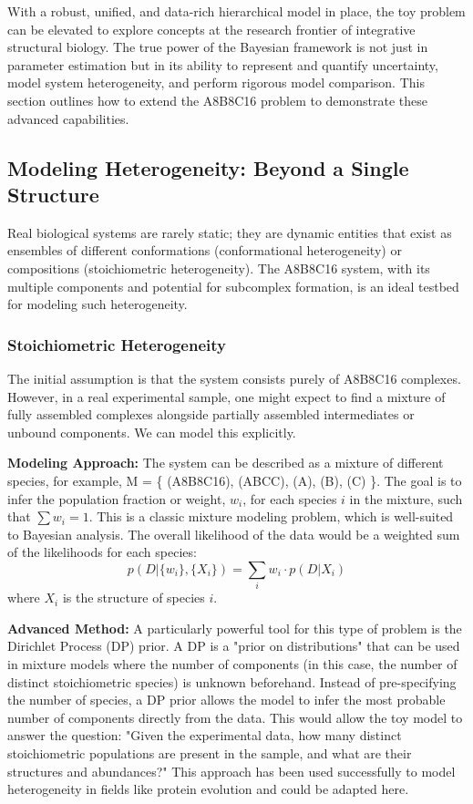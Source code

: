 \documentclass{article}
\begin{document}
With a robust, unified, and data-rich hierarchical model in place, the toy problem can be elevated to explore concepts at the research frontier of integrative structural biology. The true power of the Bayesian framework is not just in parameter estimation but in its ability to represent and quantify uncertainty, model system heterogeneity, and perform rigorous model comparison. This section outlines how to extend the A8B8C16 problem to demonstrate these advanced capabilities.

\subsection{Modeling Heterogeneity: Beyond a Single Structure}

Real biological systems are rarely static; they are dynamic entities that exist as ensembles of different conformations (conformational heterogeneity) or compositions (stoichiometric heterogeneity).\cite{ref37} The A8B8C16 system, with its multiple components and potential for subcomplex formation, is an ideal testbed for modeling such heterogeneity.

\subsubsection{Stoichiometric Heterogeneity}

The initial assumption is that the system consists purely of A8B8C16 complexes. However, in a real experimental sample, one might expect to find a mixture of fully assembled complexes alongside partially assembled intermediates or unbound components. We can model this explicitly.

\textbf{Modeling Approach:} The system can be described as a mixture of different species, for example, M = \{ (A8B8C16), (ABCC), (A), (B), (C) \}. The goal is to infer the population fraction or weight, $w_i$, for each species $i$ in the mixture, such that $\sum w_i = 1$. This is a classic mixture modeling problem, which is well-suited to Bayesian analysis.\cite{ref39} The overall likelihood of the data would be a weighted sum of the likelihoods for each species:
\[ p(D | \{w_i\}, \{X_i\}) = \sum_i w_i \cdot p(D | X_i) \]
where $X_i$ is the structure of species $i$.

\textbf{Advanced Method:} A particularly powerful tool for this type of problem is the Dirichlet Process (DP) prior.\cite{ref39} A DP is a "prior on distributions" that can be used in mixture models where the number of components (in this case, the number of distinct stoichiometric species) is unknown beforehand. Instead of pre-specifying the number of species, a DP prior allows the model to infer the most probable number of components directly from the data. This would allow the toy model to answer the question: "Given the experimental data, how many distinct stoichiometric populations are present in the sample, and what are their structures and abundances?" This approach has been used successfully to model heterogeneity in fields like protein evolution and could be adapted here.\cite{ref39}
\end{document}
